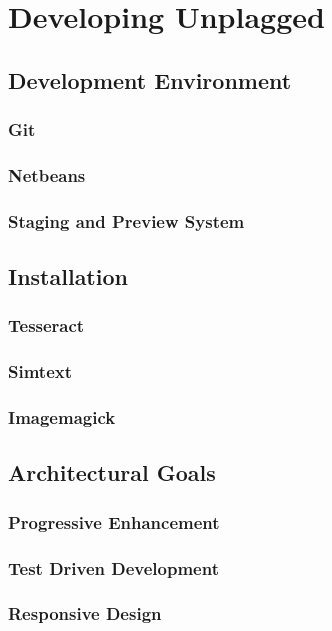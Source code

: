\chapter{Developing Unplagged}\label{chap:developingUnplagged}

\section{Development Environment}

\subsection{Git}
\subsection{Netbeans}
\subsection{Staging and Preview System}

\section{Installation}
\subsection{Tesseract}
\subsection{Simtext}
\subsection{Imagemagick}



\section{Architectural Goals}

\subsection{Progressive Enhancement}

\subsection{Test Driven Development}

\subsection{Responsive Design}